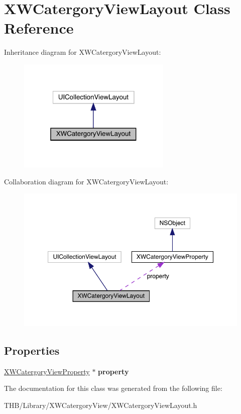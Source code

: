 \hypertarget{interface_x_w_catergory_view_layout}{}\section{X\+W\+Catergory\+View\+Layout Class Reference}
\label{interface_x_w_catergory_view_layout}


Inheritance diagram for X\+W\+Catergory\+View\+Layout\+:\nopagebreak
\begin{figure}[H]
\begin{center}
\leavevmode
\includegraphics[width=208pt]{interface_x_w_catergory_view_layout__inherit__graph}
\end{center}
\end{figure}


Collaboration diagram for X\+W\+Catergory\+View\+Layout\+:\nopagebreak
\begin{figure}[H]
\begin{center}
\leavevmode
\includegraphics[width=350pt]{interface_x_w_catergory_view_layout__coll__graph}
\end{center}
\end{figure}
\subsection*{Properties}
\begin{DoxyCompactItemize}
\item 
\mbox{\label{interface_x_w_catergory_view_layout_a3eb8692d74ae9ada10847a1a9d83e6c1}} 
\mbox{\hyperlink{interface_x_w_catergory_view_property}{X\+W\+Catergory\+View\+Property}} $\ast$ {\bfseries property}
\end{DoxyCompactItemize}


The documentation for this class was generated from the following file\+:\begin{DoxyCompactItemize}
\item 
T\+H\+B/\+Library/\+X\+W\+Catergory\+View/X\+W\+Catergory\+View\+Layout.\+h\end{DoxyCompactItemize}
